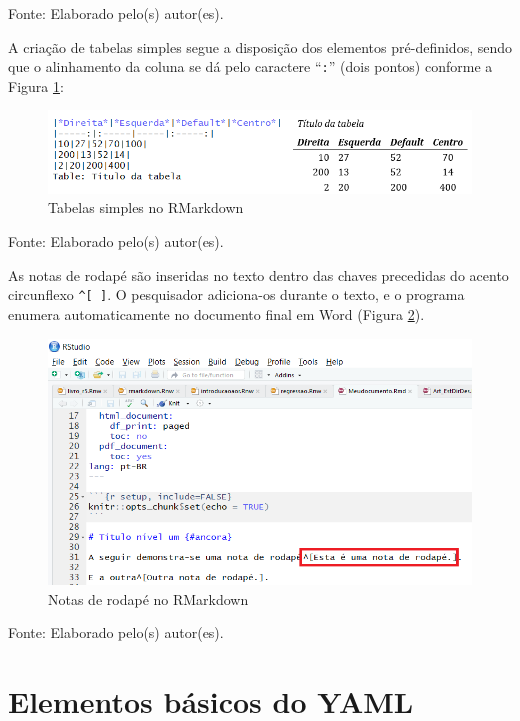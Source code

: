 \documentclass[12pt,brazil,oneside]{book}
\begin{document}
Fonte: Elaborado pelo(s) autor(es).

A criação de tabelas simples segue a disposição dos elementos pré-definidos, sendo que o alinhamento da coluna se dá pelo caractere ``\texttt{:}'' (dois pontos) conforme a Figura \ref{fig:rmarktab}:

\begin{figure}[H]

{\centering \includegraphics[width=0.7\linewidth]{rmarktab} 

}

\caption{Tabelas simples no RMarkdown}\label{fig:rmarktab}
\end{figure}

Fonte: Elaborado pelo(s) autor(es).

As notas de rodapé são inseridas no texto dentro das chaves precedidas do acento circunflexo \texttt{\^{}{[}\ {]}}. O pesquisador adiciona-os durante o texto, e o programa enumera automaticamente no documento final em Word (Figura \ref{fig:rmarkrodape}).

\begin{figure}[H]

{\centering \includegraphics[width=0.7\linewidth]{rmarkrodape} 

}

\caption{Notas de rodapé no RMarkdown}\label{fig:rmarkrodape}
\end{figure}

Fonte: Elaborado pelo(s) autor(es).

\hypertarget{elementos-basicos-do-yaml}{%
\section{Elementos básicos do YAML}\label{elementos-basicos-do-yaml}}
\end{document}
